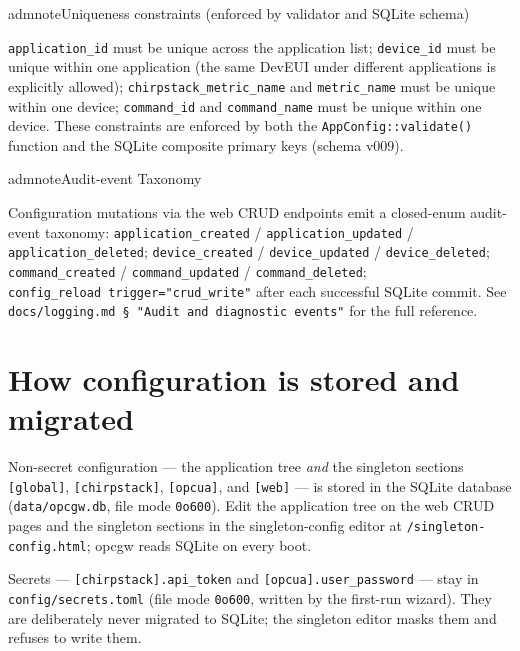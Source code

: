 \begin{admonition}{admnote}{Uniqueness constraints (enforced by validator and SQLite schema)}

\texttt{application\_id} must be unique across the application list; \texttt{device\_id} must be unique within one application (the same DevEUI under different applications is explicitly allowed); \texttt{chirpstack\_metric\_name} and \texttt{metric\_name} must be unique within one device; \texttt{command\_id} and \texttt{command\_name} must be unique within one device. These constraints are enforced by both the \texttt{AppConfig::validate()} function and the SQLite composite primary keys (schema v009).

\end{admonition}

\begin{admonition}{admnote}{Audit-event Taxonomy}

Configuration mutations via the web CRUD endpoints emit a closed-enum audit-event taxonomy: \texttt{application\_created} / \texttt{application\_updated} / \texttt{application\_deleted}; \texttt{device\_created} / \texttt{device\_updated} / \texttt{device\_deleted}; \texttt{command\_created} / \texttt{command\_updated} / \texttt{command\_deleted}; \texttt{config\_reload\ trigger="crud\_write"} after each successful SQLite commit. See \texttt{docs/logging.md\ §\ "Audit\ and\ diagnostic\ events"} for the full reference.

\end{admonition}

\section{How configuration is stored and migrated}\label{sec-config-storage}

Non-secret configuration --- the application tree \emph{and} the singleton sections \texttt{{[}global{]}}, \texttt{{[}chirpstack{]}}, \texttt{{[}opcua{]}}, and \texttt{{[}web{]}} --- is stored in the SQLite database (\texttt{data/opcgw.db}, file mode \texttt{0o600}). Edit the application tree on the web CRUD pages and the singleton sections in the singleton-config editor at \texttt{/singleton-config.html}; opcgw reads SQLite on every boot.

Secrets --- \texttt{{[}chirpstack{]}.api\_token} and \texttt{{[}opcua{]}.user\_password} --- stay in \texttt{config/secrets.toml} (file mode \texttt{0o600}, written by the first-run wizard). They are deliberately never migrated to SQLite; the singleton editor masks them and refuses to write them.

